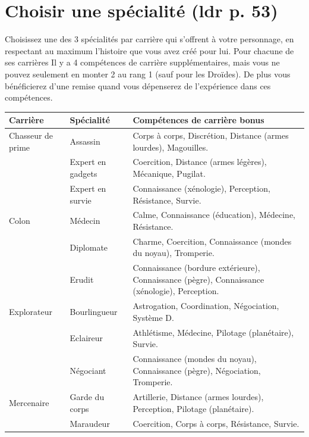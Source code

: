\documentclass[twoside]{article}
\begin{document}
\section{Choisir une spécialité (ldr p. 53)}
Choisissez une des 3 spécialités par carrière qui s'offrent à votre personnage, en respectant au maximum l'histoire que vous avez créé pour lui. Pour chacune de ses carrières Il y a 4 compétences de carrière supplémentaires, mais vous ne pouvez seulement en monter 2 au rang 1 (sauf pour les Droïdes). De plus vous bénéficierez d'une remise quand vous dépenserez de l'expérience dans ces compétences.

\begin{center}
	\begin{tabular}{|m{3cm}|m{3cm}|p{10cm}|}
		\hline
		\cellcolor{DarkRed} {\large \textcolor{PureWhite}{\textbf{Carrière}}} & \cellcolor{DarkRed} {\large \textcolor{PureWhite}{\textbf{Spécialité}}} & \cellcolor{DarkRed} {\large \textcolor{PureWhite}{\textbf{Compétences de carrière bonus}}} \\
		\hline
		Chasseur de prime & Assassin & Corps à corps, Discrétion, Distance (armes lourdes), Magouilles. \\
		\cline{2-3} & Expert en gadgets & Coercition, Distance (armes légères), Mécanique, Pugilat. \\
		\cline{2-3} & Expert en survie & Connaissance (xénologie), Perception, Résistance, Survie. \\ 
		\hline
		Colon & Médecin & Calme, Connaissance (éducation), Médecine, Résistance. \\
		\cline{2-3} & Diplomate & Charme, Coercition, Connaissance (mondes du noyau), Tromperie. \\
		\cline{2-3} & Erudit & Connaissance (bordure extérieure), Connaissance (pègre), Connaissance (xénologie), Perception. \\
		\hline
		Explorateur & Bourlingueur & Astrogation, Coordination, Négociation, Système D. \\
		\cline{2-3} & Eclaireur & Athlétisme, Médecine, Pilotage (planétaire), Survie. \\
		\cline{2-3} & Négociant & Connaissance (mondes du noyau), Connaissance (pègre), Négociation, Tromperie. \\
		\hline
		Mercenaire & Garde du corps & Artillerie, Distance (armes lourdes), Perception, Pilotage (planétaire). \\
		\cline{2-3} & Maraudeur & Coercition, Corps à corps, Résistance, Survie. \\

\end{tabular}
\end{center}
\end{document}
